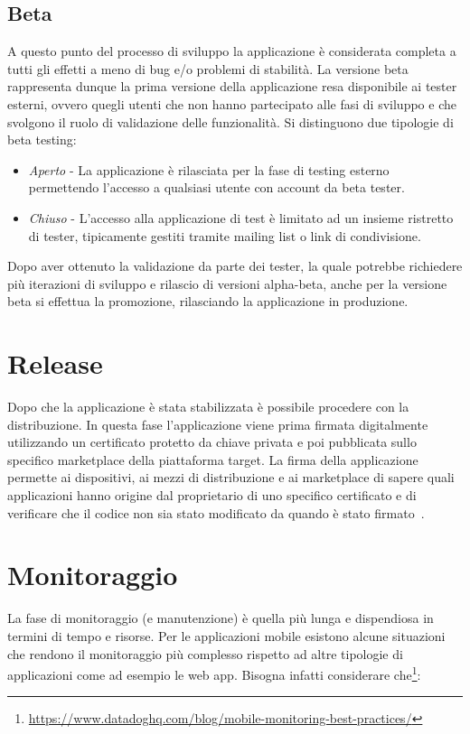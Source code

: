 \subsection{Beta}
A questo punto del processo di sviluppo la applicazione è considerata completa a tutti gli effetti a meno di bug e/o problemi di stabilità. La versione beta rappresenta dunque la prima versione della applicazione resa disponibile ai tester esterni, ovvero quegli utenti che non hanno partecipato alle fasi di sviluppo e che svolgono il ruolo di validazione delle funzionalità. Si distinguono due tipologie di beta testing:

\begin{itemize}
    \item \textit{Aperto} - La applicazione è rilasciata per la fase di testing esterno permettendo l'accesso a qualsiasi utente con account da beta tester.
    \item \textit{Chiuso} - L'accesso alla applicazione di test è limitato ad un insieme ristretto di tester, tipicamente gestiti tramite mailing list o link di condivisione.
\end{itemize}

Dopo aver ottenuto la validazione da parte dei tester, la quale potrebbe richiedere più iterazioni di sviluppo e rilascio di versioni alpha-beta, anche per la versione beta si effettua la promozione, rilasciando la applicazione in produzione.

\section{Release}
Dopo che la applicazione è stata stabilizzata è possibile procedere con la distribuzione. In questa fase l'applicazione viene prima firmata digitalmente utilizzando un certificato protetto da chiave privata e poi pubblicata sullo specifico marketplace della piattaforma target. La firma della applicazione permette ai dispositivi, ai mezzi di distribuzione e ai marketplace di sapere quali applicazioni hanno origine dal proprietario di uno specifico certificato e di verificare che il codice non sia stato modificato da quando è stato firmato~\cite{mednieks20011programming}.

\section{Monitoraggio}
La fase di monitoraggio (e manutenzione) è quella più lunga e dispendiosa in termini di tempo e risorse. Per le applicazioni mobile esistono alcune situazioni che rendono il monitoraggio più complesso rispetto ad altre tipologie di applicazioni come ad esempio le web app. Bisogna infatti considerare che\footnote{\href{https://www.datadoghq.com/blog/mobile-monitoring-best-practices/}{https://www.datadoghq.com/blog/mobile-monitoring-best-practices/}}:


